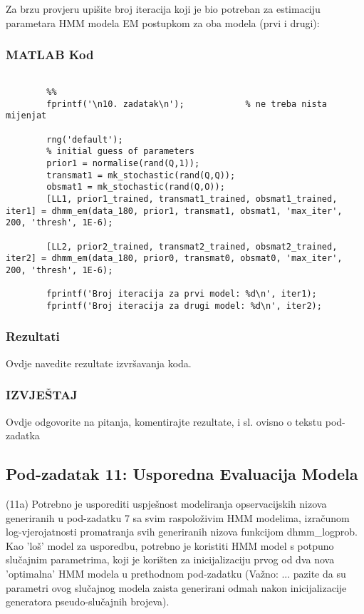 \documentclass[12pt]{article}
\begin{document}
	Za brzu provjeru upišite broj iteracija koji je bio potreban za estimaciju parametara HMM modela EM postupkom za oba modela (prvi i drugi):
	
	\subsubsection*{MATLAB Kod}
	\begin{lstlisting}
		
		%%
		fprintf('\n10. zadatak\n');            % ne treba nista mijenjat
		
		rng('default');
		% initial guess of parameters
		prior1 = normalise(rand(Q,1));
		transmat1 = mk_stochastic(rand(Q,Q));
		obsmat1 = mk_stochastic(rand(Q,O));
		[LL1, prior1_trained, transmat1_trained, obsmat1_trained, iter1] = dhmm_em(data_180, prior1, transmat1, obsmat1, 'max_iter', 200, 'thresh', 1E-6);
		
		[LL2, prior2_trained, transmat2_trained, obsmat2_trained, iter2] = dhmm_em(data_180, prior0, transmat0, obsmat0, 'max_iter', 200, 'thresh', 1E-6);
		
		fprintf('Broj iteracija za prvi model: %d\n', iter1);
		fprintf('Broj iteracija za drugi model: %d\n', iter2);
	\end{lstlisting}
	
	\subsubsection*{Rezultati}
	Ovdje navedite rezultate izvršavanja koda.
	
	\subsubsection*{IZVJEŠTAJ}
	Ovdje odgovorite na pitanja, komentirajte rezultate, i sl. ovisno o tekstu pod-zadatka
	
	\subsection{Pod-zadatak 11: Usporedna Evaluacija Modela}
	(11a) Potrebno je usporediti uspješnost modeliranja opservacijskih nizova generiranih u pod-zadatku 7 sa svim raspoloživim HMM modelima, izračunom log-vjerojatnosti promatranja svih generiranih nizova funkcijom dhmm\_logprob. Kao 'loš' model za usporedbu, potrebno je koristiti HMM model s potpuno slučajnim parametrima, koji je korišten za inicijalizaciju prvog od dva nova 'optimalna' HMM modela u prethodnom pod-zadatku (Važno: ... pazite da su parametri ovog slučajnog modela zaista generirani odmah nakon inicijalizacije generatora pseudo-slučajnih brojeva).
	
\end{document}
